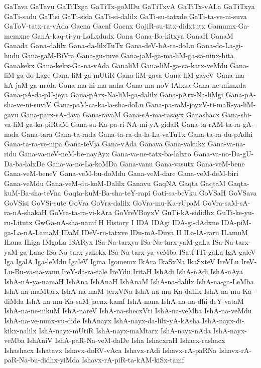 {GaTava
GaTavu
GaTiTxga
GaTiTx-goMDu
GaTiTxvA
GaTiTx-vALa
GaTiTxya
GaTi-sadu
GaTisi
GaTi-sida
GaTi-si-dalilx
GaTi-su-tatxde
GaTi-ta-ve-ni-suva
GaToV-tatx-ra-vAda
Gacna
Gacnf
Gacnx
GajiR-su-titx-didxtutx
Gamumx-Ga-memxne
GanA-kaq-ti-yu-LaLxdudx
Gana
Gana-Ba-kitxya
GanaH
GanaM
Ganada
Gana-dalilx
Gana-da-lilxTuTx
Gana-deV-hA-ra-doLu
Gana-do-La-gi-hudu
Gana-gaM-BiVra
Gana-gu-ruve
Gana-jaM-ga-ma-liM-ga-sa-ninx-hita
Ganakekx
Gana-kekx-Ga-na-vAda
GanaliM
Gana-liM-ga-ca-karx-veMdu
Gana-liM-ga-do-Lage
Gana-liM-ga-mUtiR
Gana-liM-gava
Gana-liM-gaveV
Gana-ma-hA-jaM-ga-mada
Gana-ma-hi-ma-naha
Gana-ma-noV-lAlxsa
Gana-ne-mimxda
Gana-pA-da-pU-jeya
Gana-pArx-Na-liM-ga-dalilx
Gana-pArx-Na-liMgi
Gana-pA-sha-ve-ni-suviV
Gana-paM-ca-ka-la-sha-doLu
Gana-pa-raM-joyxV-ti-maR-ya-liM-gavu
Gana-parx-sA-dava
Gana-ravaM
Gana-sA-ma-rasayx
Ganashacx
Gana-shi-va-liM-ga-ka-piRtaM
Gana-su-Ka-pa-ri-NA-mi-yA-gidaR
Gana-ta-rAM-ta-ra-gA-nada
Gana-tara
Gana-ta-rada
Gana-ta-ra-da-la-La-vaTuTx
Gana-ta-ra-du-pAdhi
Gana-ta-ra-ve-nipa
Gana-teVja
Gana-vAda
Ganava
Gana-vakukx
Gana-va-na-ridu
Gana-va-neV-neM-be-nayAyx
Gana-va-ne-tatx-ba-lalxro
Gana-va-no-Da-gU-Da-ba-lalxDe
Gana-va-no-La-koMDa
Gana-vanu
Gana-vasutx
Gana-veM-bene
Gana-veM-beneV
Gana-veM-bu-doMdu
Gana-veM-dare
Gana-veM-deM-biri
Gana-veMdu
Gana-veM-du-koM-Dalilx
Ganavu
GaqNA
Gaqta
GaqtaM
Gaqta-kuM-Ba-sha-teVna
Gaqta-kuM-Ba-sha-teY-rapi
Gati-sa-beVku
GoVSaH
GoVSava
GoVSisi
GoVSi-sute
GoVra
GoVra-dalilx
GoVra-mu-Ka-rUpaM
GoVra-saM-sA-ra-nA-shakaH
GoVra-ta-ra-vi-kAra
GoVreVBoyxV
GuTi-kA-sididhx
GuTi-ke-yu-ru-Litutx
GwGa-nA-sha-namf
H
History
I
IDA
IDAgi
IDA-gi-dAdxne
IDA-piM-ga-La-nA-LamaM
IDaM
IDeV-ru-tatxve
IDu-mA-Duva
II
ILa-lA-raru
ILamuM
ILana
ILiga
IMgaLa
ISARyx
ISa-Na-tarxya
ISa-Na-tarx-yaM-gaLa
ISa-Na-tarx-yaM-ga-Lane
ISa-Na-tarx-yakekx
ISa-Na-tarx-ya-veMba
ISatf
ITi-gaLa
IgA-galeV
Iga
IgalA
Iga-leMdu
IgaleV
Igina
Igomemx
IkAra
IkaSxNa
IkaSxteV
IreVLu
IreV-Lu-Bu-va-na-vanu
IreY-da-ra-tale
IreYdu
IritaH
IshAdi
IshA-nAdi
IshA-nAya
IshA-nA-ya-namaH
IshAna
IshAnaH
IshAnaM
IshA-na-dalilx
IshA-na-ga-LeMba
IshA-na-maMtarx
IshA-na-maM-terxVNa
IshA-na-mu-Ka-dalilx
IshA-na-mu-Ka-diMda
IshA-na-mu-Ka-saM-jacnx-kamf
IshA-nana
IshA-na-na-dhi-deY-vataM
IshA-na-ne-nikuM
IshA-nareV
IshA-na-shecxVti
IshA-na-veMba
IshA-na-veMdu
IshA-na-ve-nunx-vu-dide
IshAnayx
IshA-nayx-da-lilx-yA-kAsha
IshA-nayx-di-kikx-nalilx
IshA-nayx-mUtiR
IshA-nayx-maMtarx
IshA-nayx-nAda
IshA-nayx-veMba
IshAniV
IshA-paR-Na-veM-daDe
Isha
IshacxraH
Ishacx-rashacx
Ishashacx
Ishatavx
Ishavx-doRV-vAca
Ishavx-rAdi
Ishavx-rA-paRNa
Ishavx-rA-paR-Na-bu-didhx-yiMda
Ishavx-rA-piR-ta-kAM-kiSx-tamf
}

